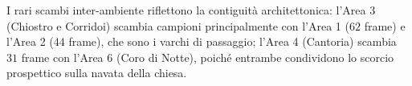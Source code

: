 I rari scambi inter-ambiente riflettono la contiguità architettonica: l'Area 3 (Chiostro e Corridoi) scambia campioni principalmente con l'Area 1 ($62$ frame) e l'Area 2 ($44$ frame), che sono i varchi di passaggio; l'Area 4 (Cantoria) scambia $31$ frame con l'Area 6 (Coro di Notte), poiché entrambe condividono lo scorcio prospettico sulla navata della chiesa.
